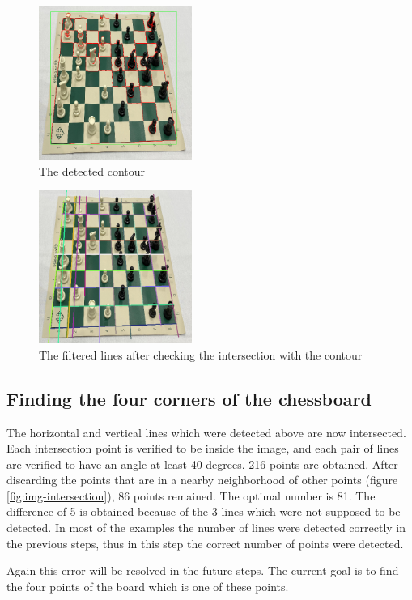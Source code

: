 \documentclass[conference]{IEEEtran}
\begin{document}
\begin{figure}[bt] 
    \centering
    \includegraphics[width=5cm]{Figures/imgWithContours.png}
    \caption{The detected contour}
    \label{fig:img-contour}
\end{figure}

\begin{figure}[bt] 
    \centering
    \includegraphics[width=5cm]{Figures/Reduced Lines filtered.png}
    \caption{The filtered lines after checking the intersection with the contour}
    \label{fig:img-filtered}
\end{figure}

\subsection{Finding the four corners of the chessboard}

The horizontal and vertical lines which were detected above are now intersected. Each intersection point is verified to be inside the image, and each pair of lines are verified to have an angle at least 40 degrees. 216 points are obtained. After discarding the points that are in a nearby neighborhood of other points (figure \ref{fig:img-intersection}), 86 points remained. The optimal number is 81. The difference of 5 is obtained because of the 3 lines which were not supposed to be detected. In most of the examples the number of lines were detected correctly in the previous steps, thus in this step the correct number of points were detected.

Again this error will be resolved in the future steps. The current goal is to find the four points of the board which is one of these points.
\end{document}
